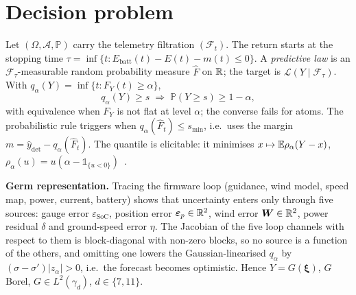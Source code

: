 \documentclass[10pt,twocolumn]{article}
\newcommand{\Germ}{\bm\xi}
\newcommand{\Norm}{\mathcal N}
\newcommand{\erf}{\operatorname{erf}}
\newcommand{\T}{^{\mathsf T}}
\newcommand{\ind}[1]{\mathds 1_{\{#1\}}}
\newcommand{\Prob}{\mathbb P}
\newcommand{\Id}{\mathrm I}
\newcommand{\dt}{\hat y_{\mathrm{det}}}
\begin{document}
\maketitle

\begin{abstract}
\noindent A drone triggers its automatic return when the remaining energy no longer covers the predicted return energy plus a margin $m=\kappa E+c$. Read as a Gaussian forecast, this rule has a spread that depends on the flight only through $E$. We build a flight-conditional predictive law of the arrival state of charge $Y$. Under explicit assumptions the prediction loop has exactly five exogenous random inputs and $Y=G(\Germ)$, $\Germ\sim\Norm(0,\Id_d)$. Each source is modelled as $\mu+F\Germ$ with a germ frozen over the return, which forces the model to expose $F$ rather than $FF\T$. Candidate models are ranked by a logarithmic CRPS skill score that splits exactly into a centre and a width term, the latter bounded by $-\log_{10}\erf\sqrt{\ln 2/2}\approx0.2256$. On board, $G$ is propagated by an unscented transform and by a Hermite polynomial chaos whose coefficients are learnt online by a Kalman filter, with a three-term bound on the decision quantile. The value of conditioning is shown to be of second order.
\end{abstract}

\section{Decision problem}
Let $(\Omega,\mathcal A,\Prob)$ carry the telemetry filtration $(\mathcal F_t)$. The return starts at the stopping time $\tau=\inf\{t:E_{\mathrm{batt}}(t)-E(t)-m(t)\le0\}$. A \emph{predictive law} is an $\mathcal F_{\tau}$-measurable random probability measure $\hat F$ on $\mathbb{R}$; the target is $\mathcal L(Y\mid\mathcal F_\tau)$. With $q_\alpha(Y)=\inf\{t:F_Y(t)\ge\alpha\}$,
\begin{equation}\label{eq:chance}
q_\alpha(Y)\ge s\;\Rightarrow\;\Prob(Y\ge s)\ge1-\alpha,
\end{equation}
with equivalence when $F_Y$ is not flat at level $\alpha$; the converse fails for atoms. The probabilistic rule triggers when $q_\alpha(\hat F_t)\le s_{\min}$, i.e.\ uses the margin $m=\dt-q_\alpha(\hat F_t)$. The quantile is elicitable: it minimises $x\mapsto\mathbb{E}\rho_\alpha(Y-x)$, $\rho_\alpha(u)=u(\alpha-\ind{u<0})$~\cite{koenker1978}.

\textbf{Germ representation.} Tracing the firmware loop (guidance, wind model, speed map, power, current, battery) shows that uncertainty enters only through five sources: gauge error $\varepsilon_{\mathrm{SoC}}$, position error $\bm\varepsilon_p\in\mathbb{R}^2$, wind error $\bm W\in\mathbb{R}^2$, power residual $\delta$ and ground-speed error $\eta$. The Jacobian of the five loop channels with respect to them is block-diagonal with non-zero blocks, so no source is a function of the others, and omitting one lowers the Gaussian-linearised $q_\alpha$ by $(\sigma-\sigma')|z_\alpha|>0$, i.e.\ the forecast becomes optimistic. Hence $Y=G(\Germ)$, $G$ Borel, $G\in L^2(\gamma_d)$, $d\in\{7,11\}$.
\end{document}
